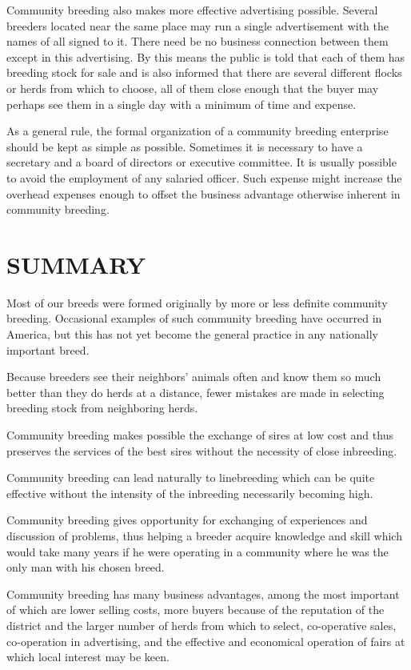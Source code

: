 Community breeding also makes more effective advertising possible.
Several breeders located near the same place may run a single advertisement
with the names of all signed to it. There need be no business connection
between them except in this advertising. By this means the
public is told that each of them has breeding stock for sale and is also
informed that there are several different flocks or herds from which to
choose, all of them close enough that the buyer may perhaps see them
in a single day with a minimum of time and expense.

As a general rule, the formal organization of a community breeding
enterprise should be kept as simple as possible. Sometimes it is necessary
to have a secretary and a board of directors or executive committee. It is
usually possible to avoid the employment of any salaried officer. Such
expense might increase the overhead expenses enough to offset the business
advantage otherwise inherent in community breeding.

\section*{SUMMARY}

Most of our breeds were formed originally by more or less definite
community breeding. Occasional examples of such community breeding
have occurred in America, but this has not yet become the general
practice in any nationally important breed.
\noclub

Because breeders see their neighbors' animals often and know them
so much better than they do herds at a distance, fewer mistakes are
made in selecting breeding stock from neighboring herds.

Community breeding makes possible the exchange of sires at low
cost and thus preserves the services of the best sires without the necessity
of close inbreeding.

Community breeding can lead naturally to linebreeding which can
be quite effective without the intensity of the inbreeding necessarily
becoming high.

Community breeding gives opportunity for exchanging of experiences
and discussion of problems, thus helping a breeder acquire
knowledge and skill which would take many years if he were operating
in a community where he was the only man with his chosen breed.

Community breeding has many business advantages, among the
most important of which are lower selling costs, more buyers because of
the reputation of the district and the larger number of herds from
which to select, co-operative sales, co-operation in advertising, and the
effective and economical operation of fairs at which local interest may
be keen.
